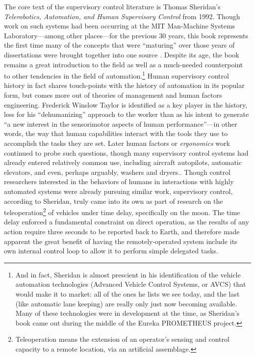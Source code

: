 The core text of the supervisory control literature is Thomas
Sheridan's \emph{Telerobotics, Automation, and Human Supervisory
  Control} from 1992. Though work on such systems had been occurring
at the MIT Man-Machine Systems Laboratory---among other places---for
the previous 30 years, this book represents the first time many of the
concepts that were ``maturing'' over those years of dissertations were
brought together into one source \cite[p. xix]{sheridan}. Despite its
age, the book remains a great introduction to the field as well as a
much-needed counterpoint to other tendencies in the field of
automation.\footnote{And in fact, Sheridan is almost prescient in his
  identification of the vehicle automation technologies (Advanced
  Vehicle Control Systems, or AVCS) that would
  make it to market: all of the ones he lists we see today, and the
  last (like automatic lane keeping) are really only just now becoming
  available. Many of these technologies were in development at the
  time, as Sheridan's book came out during the middle of the Eureka
  PROMETHEUS project.} Human supervisory control history in fact
shares touch-points with the history of automation in its popular
form, but comes more out of theories of management and human factors
engineering. Frederick Winslow Taylor is identified as a key player in
the history, less for his ``dehumanizing'' approach to the worker than
as
his intent to generate ``a new interest in the sensorimotor aspects of
human performance''---in other words, the way that human capabilities
interact with the tools they use to accomplish the tasks they are
set\cite[p. 7]{sheridan}. Later human factors or \emph{ergonomics}
work continued to probe such questions, though many supervisory
control systems had already entered relatively common use, including
aircraft autopilots, automatic elevators, and even, perhaps arguably,
washers and dryers.\cite[p. 8]{sheridan}. Though control researchers
interested in the behaviors of humans in interactions with highly
automated systems were already pursuing similar work, supervisory
control, according to Sheridan, truly came into its own as part of
research on the teleoperation\footnote{Teleoperation means the
  extension of an operator's sensing and control capacity to a remote
  location, via an artificial assemblage.\cite[p. 4]{sheridan}} of vehicles under time delay,
specifically on the moon. The time delay enforced a fundamental
constraint on direct operation, as the results of any action require
three seconds to be reported back to Earth, and therefore made
apparent the great benefit of having the remotely-operated system
include its own internal control loop to allow it to perform simple
delegated tasks.\cite[p. 9]{sheridan}

